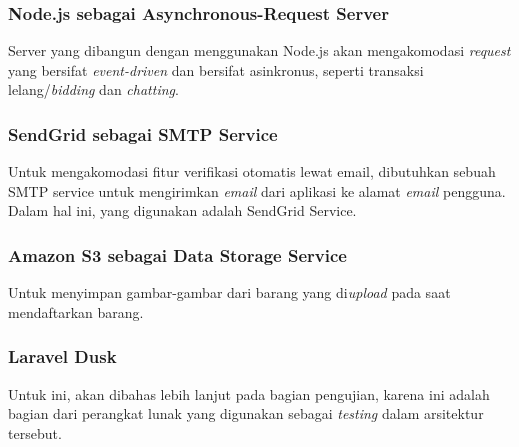 	\subsubsection{\textbf{Node.js} sebagai Asynchronous-Request Server}
    Server yang dibangun dengan menggunakan Node.js akan mengakomodasi \textit{request} yang bersifat \textit{event-driven} dan bersifat asinkronus, seperti transaksi lelang/\textit{bidding} dan \textit{chatting}.
    
    \subsubsection{\textbf{SendGrid} sebagai SMTP Service}
    Untuk mengakomodasi fitur verifikasi otomatis lewat email, dibutuhkan sebuah SMTP service untuk mengirimkan \textit{email} dari aplikasi ke alamat \textit{email} pengguna. Dalam hal ini, yang digunakan adalah SendGrid Service.
    
    \subsubsection{\textbf{Amazon S3} sebagai Data Storage Service}
    Untuk menyimpan gambar-gambar dari barang yang di\textit{upload} pada saat mendaftarkan barang.

	\subsubsection{\textbf{Laravel Dusk}}
	Untuk ini, akan dibahas lebih lanjut pada bagian pengujian, karena ini adalah bagian dari perangkat lunak yang digunakan sebagai \textit{testing} dalam arsitektur tersebut.
      
   
      
    